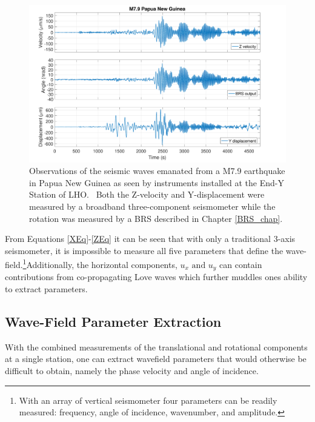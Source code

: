 \documentclass [12pt, proquest]{uwthesis}[2019]
\begin{document}
\begin{figure}[!h]
\begin{center}
\includegraphics[width=\textwidth]{PNGTimeSeries.pdf}
\caption[Observations of the seismic waves by instruments installed at the End-Y Station of LHO]{Observations of the seismic waves emanated from a M7.9 earthquake in Papua New Guinea as seen by instruments installed at the End-Y Station of LHO.~\cite{tiltSeismology} Both the Z-velocity and Y-displacement were measured by a broadband three-component seismometer while the rotation was measured by a BRS described in Chapter \ref{BRS_chap}. }
\label{Earthquake}
\end{center}
\end{figure}

From Equations \ref{XEq}-\ref{ZEq} it can be seen that with only a traditional 3-axis seismometer, it is impossible to measure all five parameters that define the wave-field.\footnote{With an array of vertical seismometer four parameters can be readily measured: frequency, angle of incidence, wavenumber, and amplitude.}Additionally, the horizontal components, $u_x\text{ and }u_y$ can contain contributions from co-propagating Love waves which further muddles ones ability to extract parameters. 


\subsection{Wave-Field Parameter Extraction}

With the combined measurements of the translational and rotational components at a single station, one can extract wavefield parameters that would otherwise be difficult to obtain, namely the phase velocity and angle of incidence. 
\end{document}
